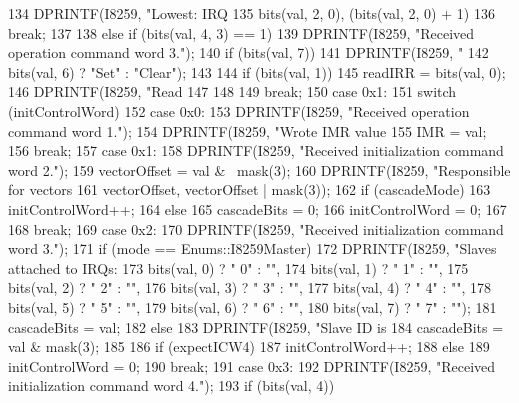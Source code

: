 \begin{DoxyCode}
{{{{134                 DPRINTF(I8259, "Lowest: IRQ%
135                         bits(val, 2, 0), (bits(val, 2, 0) + 1) %
136                 break;
137             }
138         } else if (bits(val, 4, 3) == 1) {
139             DPRINTF(I8259, "Received operation command word 3.\n");
140             if (bits(val, 7)) {
141                 DPRINTF(I8259, "%
142                         bits(val, 6) ? "Set" : "Clear");
143             }
144             if (bits(val, 1)) {
145                 readIRR = bits(val, 0);
146                 DPRINTF(I8259, "Read %
147             }
148         }
149         break;
150       case 0x1:
151         switch (initControlWord) {
152           case 0x0:
153             DPRINTF(I8259, "Received operation command word 1.\n");
154             DPRINTF(I8259, "Wrote IMR value %
155             IMR = val;
156             break;
157           case 0x1:
158             DPRINTF(I8259, "Received initialization command word 2.\n");
159             vectorOffset = val & ~mask(3);
160             DPRINTF(I8259, "Responsible for vectors %
161                     vectorOffset, vectorOffset | mask(3));
162             if (cascadeMode) {
163                 initControlWord++;
164             } else {
165                 cascadeBits = 0;
166                 initControlWord = 0;
167             }
168             break;
169           case 0x2:
170             DPRINTF(I8259, "Received initialization command word 3.\n");
171             if (mode == Enums::I8259Master) {
172                 DPRINTF(I8259, "Slaves attached to IRQs:%
173                         bits(val, 0) ? " 0" : "",
174                         bits(val, 1) ? " 1" : "",
175                         bits(val, 2) ? " 2" : "",
176                         bits(val, 3) ? " 3" : "",
177                         bits(val, 4) ? " 4" : "",
178                         bits(val, 5) ? " 5" : "",
179                         bits(val, 6) ? " 6" : "",
180                         bits(val, 7) ? " 7" : "");
181                 cascadeBits = val;
182             } else {
183                 DPRINTF(I8259, "Slave ID is %
184                 cascadeBits = val & mask(3);
185             }
186             if (expectICW4)
187                 initControlWord++;
188             else
189                 initControlWord = 0;
190             break;
191           case 0x3:
192             DPRINTF(I8259, "Received initialization command word 4.\n");
193             if (bits(val, 4)) {
}}}}
\end{DoxyCode}
